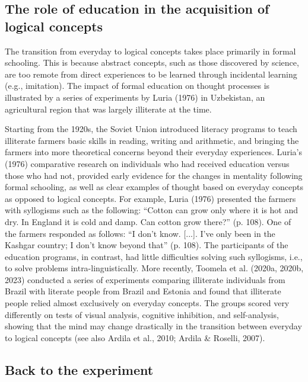 \documentclass[authordate, reflection]{jote-new-article}
\begin{document}
	\subsection{The role of education in the acquisition of logical concepts}



	The transition from everyday to logical concepts takes place primarily in formal schooling. This is because abstract concepts, such as those discovered by science, are too remote from direct experiences to be learned through incidental learning (e.g., imitation). The impact of formal education on thought processes is illustrated by a series of experiments by Luria (1976) in Uzbekistan, an agricultural region that was largely illiterate at the time.



	Starting from the 1920s, the Soviet Union introduced literacy programs to teach illiterate farmers basic skills in reading, writing and arithmetic, and bringing the farmers into more theoretical concerns beyond their everyday experiences. Luria's (1976) comparative research on individuals who had received education versus those who had not, provided early evidence for the changes in mentality following formal schooling, as well as clear examples of thought based on everyday concepts as opposed to logical concepts. For example, Luria (1976) presented the farmers with syllogisms such as the following: “Cotton can grow only where it is hot and dry. In England it is cold and damp. Can cotton grow there?” (p. 108). One of the farmers responded as follows: “I don't know. [...]. I've only been in the Kashgar country; I don't know beyond that” (p. 108). The participants of the education programs, in contrast, had little difficulties solving such syllogisms, i.e., to solve problems intra-linguistically. More recently, Toomela et al. (2020a, 2020b, 2023) conducted a series of experiments comparing illiterate individuals from Brazil with literate people from Brazil and Estonia and found that illiterate people relied almost exclusively on everyday concepts. The groups scored very differently on tests of visual analysis, cognitive inhibition, and self-analysis, showing that the mind may change drastically in the transition between everyday to logical concepts (see also Ardila et al., 2010; Ardila \& Roselli, 2007).



	\subsection{Back to the experiment}
\end{document}

